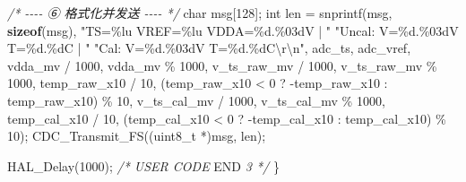 \documentclass[
  chinese,
  UTF8,
  oneside,
  openany]{ctexbook}
\newenvironment{Shaded}{}{}
\newcommand{\CommentTok}[1]{\textcolor[rgb]{0.38,0.63,0.69}{\textit{#1}}}
\newcommand{\DataTypeTok}[1]{\textcolor[rgb]{0.56,0.13,0.00}{#1}}
\newcommand{\DecValTok}[1]{\textcolor[rgb]{0.25,0.63,0.44}{#1}}
\newcommand{\KeywordTok}[1]{\textcolor[rgb]{0.00,0.44,0.13}{\textbf{#1}}}
\newcommand{\NormalTok}[1]{#1}
\newcommand{\OperatorTok}[1]{\textcolor[rgb]{0.40,0.40,0.40}{#1}}
\newcommand{\RegionMarkerTok}[1]{#1}
\newcommand{\SpecialCharTok}[1]{\textcolor[rgb]{0.25,0.44,0.63}{#1}}
\newcommand{\StringTok}[1]{\textcolor[rgb]{0.25,0.44,0.63}{#1}}
\begin{document}
\begin{Shaded}
\begin{Highlighting}[]
    \CommentTok{/* {-}{-}{-}{-} ⑥ 格式化并发送 {-}{-}{-}{-} */}
    \DataTypeTok{char}\NormalTok{ msg}\OperatorTok{[}\DecValTok{128}\OperatorTok{];}
    \DataTypeTok{int}\NormalTok{ len }\OperatorTok{=}\NormalTok{ snprintf}\OperatorTok{(}\NormalTok{msg}\OperatorTok{,} \KeywordTok{sizeof}\OperatorTok{(}\NormalTok{msg}\OperatorTok{),}
                       \StringTok{"TS=}\SpecialCharTok{\%lu}\StringTok{ VREF=}\SpecialCharTok{\%lu}\StringTok{ VDDA=}\SpecialCharTok{\%d}\StringTok{.}\SpecialCharTok{\%03d}\StringTok{V | "}
                       \StringTok{"Uncal: V=}\SpecialCharTok{\%d}\StringTok{.}\SpecialCharTok{\%03d}\StringTok{V T=}\SpecialCharTok{\%d}\StringTok{.}\SpecialCharTok{\%d}\StringTok{C | "}
                       \StringTok{"Cal:   V=}\SpecialCharTok{\%d}\StringTok{.}\SpecialCharTok{\%03d}\StringTok{V T=}\SpecialCharTok{\%d}\StringTok{.}\SpecialCharTok{\%d}\StringTok{C}\SpecialCharTok{\textbackslash{}r\textbackslash{}n}\StringTok{"}\OperatorTok{,}
\NormalTok{                       adc\_ts}\OperatorTok{,}\NormalTok{ adc\_vref}\OperatorTok{,}
\NormalTok{                       vdda\_mv }\OperatorTok{/} \DecValTok{1000}\OperatorTok{,}\NormalTok{ vdda\_mv }\OperatorTok{\%} \DecValTok{1000}\OperatorTok{,}
\NormalTok{                       v\_ts\_raw\_mv }\OperatorTok{/} \DecValTok{1000}\OperatorTok{,}\NormalTok{ v\_ts\_raw\_mv }\OperatorTok{\%} \DecValTok{1000}\OperatorTok{,}
\NormalTok{                       temp\_raw\_x10 }\OperatorTok{/} \DecValTok{10}\OperatorTok{,} \OperatorTok{(}\NormalTok{temp\_raw\_x10 }\OperatorTok{\textless{}} \DecValTok{0} \OperatorTok{?} \OperatorTok{{-}}\NormalTok{temp\_raw\_x10 }\OperatorTok{:}\NormalTok{ temp\_raw\_x10}\OperatorTok{)} \OperatorTok{\%} \DecValTok{10}\OperatorTok{,}
\NormalTok{                       v\_ts\_cal\_mv }\OperatorTok{/} \DecValTok{1000}\OperatorTok{,}\NormalTok{ v\_ts\_cal\_mv }\OperatorTok{\%} \DecValTok{1000}\OperatorTok{,}
\NormalTok{                       temp\_cal\_x10 }\OperatorTok{/} \DecValTok{10}\OperatorTok{,} \OperatorTok{(}\NormalTok{temp\_cal\_x10 }\OperatorTok{\textless{}} \DecValTok{0} \OperatorTok{?} \OperatorTok{{-}}\NormalTok{temp\_cal\_x10 }\OperatorTok{:}\NormalTok{ temp\_cal\_x10}\OperatorTok{)} \OperatorTok{\%} \DecValTok{10}\OperatorTok{);}
\NormalTok{    CDC\_Transmit\_FS}\OperatorTok{((}\DataTypeTok{uint8\_t} \OperatorTok{*)}\NormalTok{msg}\OperatorTok{,}\NormalTok{ len}\OperatorTok{);}

\NormalTok{    HAL\_Delay}\OperatorTok{(}\DecValTok{1000}\OperatorTok{);}
    \CommentTok{/* USER CODE }\RegionMarkerTok{END}\CommentTok{ 3 */}
\OperatorTok{\}}
\end{Highlighting}
\end{Shaded}
\end{document}
